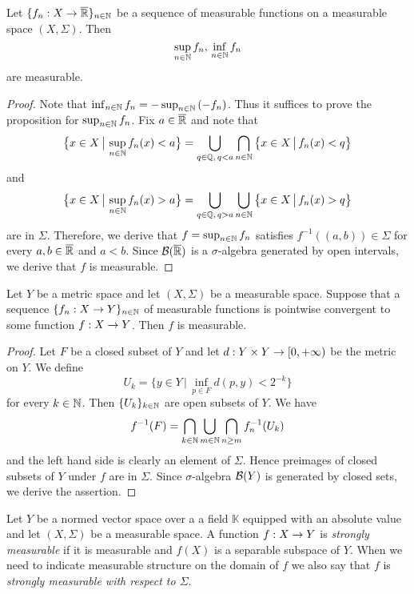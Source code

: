 \begin{proposition}\label{proposition:measurable_functions_closed_under_supremum}
Let $\{f_n:X\rightarrow \overline{{\mathbb R}}\}_{n\in {\mathbb N}}$ be a sequence of measurable functions on a measurable space $(X,\Sigma)$. Then
$$\sup_{n\in {\mathbb N}}f_n,\,\inf_{n\in {\mathbb N}}f_n$$
are measurable.
\end{proposition}
\begin{proof}
Note that $\inf_{n\in {\mathbb N}}f_n = -\sup_{n\in {\mathbb N}}\left(-f_n\right)$. Thus it suffices to prove the proposition for $\sup_{n\in {\mathbb N}}f_n$. Fix $a\in \overline{{\mathbb R}}$ and note that
$$\big\{x\in X\,\big|\,\sup_{n\in {\mathbb N}}f_n(x)< a\big\} = \bigcup_{q\in {\mathbb Q},\,q<a}\bigcap_{n\in {\mathbb N}}\big\{x\in X\,\big|\,f_n(x)<q\big\}$$
and
$$\big\{x\in X\,\big|\,\sup_{n\in {\mathbb N}}f_n(x)>a\big\} = \bigcup_{q\in {\mathbb Q},\,q>a}\bigcup_{n\in {\mathbb N}}\big\{x\in X\,\big|\,f_n(x)>q\big\}$$
are in $\Sigma$. Therefore, we derive that $f = \sup_{n\in {\mathbb N}}f_n$ satisfies $f^{-1}\left((a,b)\right)\in \Sigma$ for every $a, b\in \overline{{\mathbb R}}$ and $a<b$. Since ${\mathcal B}(\overline{{\mathbb R}})$ is a $\sigma$-algebra generated by open intervals, we derive that $f$ is measurable.
\end{proof}

\begin{proposition}\label{proposition:measurable_functions_closed_under_pointwise_limits}
Let $Y$ be a metric space and let $(X,\Sigma)$ be a measurable space. Suppose that a sequence $\{f_n:X\rightarrow Y\}_{n\in {\mathbb N}}$ of measurable functions is pointwise convergent to some function $f:X\rightarrow Y$. Then $f$ is measurable.
\end{proposition}
\begin{proof}
Let $F$ be a closed subset of $Y$ and let $d:Y\times Y\rightarrow [0,+\infty)$ be the metric on $Y$. We define
$$U_k = \big\{y \in Y\,\big|\,\inf_{p\in F} d(p,y) < 2^{-k}\big\}$$
for every $k\in {\mathbb N}$. Then $\{U_k\}_{k\in {\mathbb N}}$ are open subsets of $Y$. We have
$$f^{-1}(F) =\bigcap_{k\in {\mathbb N}}\bigcup_{m\in {\mathbb N}}\bigcap_{n\geq m}f_n^{-1}(U_k)$$
and the left hand side is clearly an element of $\Sigma$. Hence preimages of closed subsets of $Y$ under $f$ are in $\Sigma$. Since $\sigma$-algebra ${\mathcal B}(Y)$ is generated by closed sets, we derive the assertion.
\end{proof}

\begin{definition}
Let $Y$ be a normed vector space over a a field $\mathbb{K}$ equipped with an absolute value and let $(X,\Sigma)$ be a measurable space. A function $f:X\rightarrow Y$ is \textit{strongly measurable} if it is measurable and $f(X)$ is a separable subspace of $Y$. When we need to indicate measurable structure on the domain of $f$ we also say that $f$ is \textit{strongly measurable with respect to $\Sigma$}.
\end{definition}


